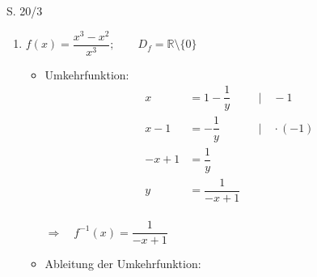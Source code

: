 \begin{Exercise}{S. 20/3}{}
\begin{enumerate}
\begin{enumerate}[label=\alph*)]
{\begin{itemize}[leftmargin=*]
{                        \begin{align*}
                            f'(x) &= \dfrac{1}{e^{x} - 1} \cdot e^{x} \cdot 1&&\\[1.5ex]
                            &= \dfrac{e^{x}}{e^{x} - 1} &&
                        \end{align*}\\[-2.0ex]
                        \begin{align*}
                            \left(f^{-1}(x)\right)' &= \dfrac{1}{f'(f^{-1}(x))} && \\[2.0ex]
                            &= \dfrac{1}{\left(\dfrac{e^{\ln\left(e^{x} + 1\right)}}{e^{\ln\left(e^{x} + 1\right)} - 1}\right)} &&\\[2.0ex]
                            &= \dfrac{e^{\ln\left(e^{x} + 1\right)} - 1}{e^{\ln\left(e^{x} + 1\right)}} &&\\[1.5ex]
                            &= \dfrac{e^{x} + 1 - 1}{e^{x} + 1} &&\\[1.5ex]
                            &= \dfrac{e^{x}}{e^{x} + 1} &&
                        \end{align*}
                        }
                \end{itemize}
                }
            \item[c)] {
                $f(x) = \dfrac{x^3-x^2}{x^{3}}; \qquad D_{f} = \mathbb{R} \setminus \{0\}$\\[-2.0ex]
                \begin{itemize}[leftmargin=*]
                    \item Umkehrfunktion: \\{
                        \vspace{-2.0ex}
                        \begin{align*}
                            x &= 1 - \dfrac{1}{y} &&| \quad -1\\[1.5ex]
                            x-1 &= -\dfrac{1}{y} &&| \quad \cdot (-1)\\[1.5ex]
                            -x + 1 &= \dfrac{1}{y} &&\\[1.5ex]
                            y &= \dfrac{1}{-x + 1} &&
                        \end{align*}\\[-2.0ex]
                        $\Rightarrow \quad f^{-1}(x) = \dfrac{1}{-x + 1}$\\[-2.0ex]
                        }
                    \item Ableitung der Umkehrfunktion: \\[-2.0ex]{
}
\end{itemize}}
\end{enumerate}
\end{enumerate}
\end{Exercise}
